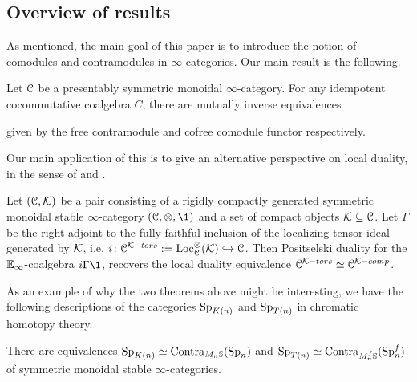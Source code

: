 \subsection*{Overview of results}

As mentioned, the main goal of this paper is to introduce the notion of comodules and contramodules in $\infty$-categories. Our main result is the following. 

\begin{introthm}
    \label{ch2:introthm:A}
    Let $\EuScript{C}$ be a presentably symmetric monoidal $\infty$-category. For any idempotent cocommutative coalgebra $C$, there are mutually inverse equivalences
    \begin{center}
    \end{center}
    given by the free contramodule and cofree comodule functor respectively. 
\end{introthm}

Our main application of this is to give an alternative perspective on local duality, in the sense of \cite{hovey-palmiery-strickland_97} and \cite{barthel-heard-valenzuela_2018}. 

\begin{introthm}
    \label{ch2:introthm:B}
    Let $(\EuScript{C}, \mathcal{K})$ be a pair consisting of a rigidly compactly generated symmetric monoidal stable $\infty$-category $(\C, \otimes, \1)$ and a set of compact objects $\mathcal{K}\subseteq \EuScript{C}$. Let $\Gamma$ be the right adjoint to the fully faithful inclusion of the localizing tensor ideal generated by $\mathcal{K}$, i.e. $i\colon\EuScript{C}^{\mathcal{K}-tors}:= \operatorname{Loc}_{\EuScript{C}}^\otimes (\mathcal{K})\hookrightarrow \EuScript{C}$. Then Positselski duality for the $\mathbb{E}_\infty$-coalgebra $i\Gamma \1$, recovers the local duality equivalence $\EuScript{C}^{\mathcal{K}-tors} \simeq \EuScript{C}^{\mathcal{K}-comp}$. 
\end{introthm}

As an example of why the two theorems above might be interesting, we have the following descriptions of the categories $\mathrm{Sp}_{K(n)}$ and $\mathrm{Sp}_{T(n)}$ in chromatic homotopy theory. 

\begin{introcor}
    There are equivalences $\mathrm{Sp}_{K(n)}\simeq \mathrm{Contra}_{M_n\mathbb{S}}(\mathrm{Sp}_n)$ and $\mathrm{Sp}_{T(n)}\simeq \mathrm{Contra}_{M_n^f \mathbb{S}}(\mathrm{Sp}_n^f)$ of symmetric monoidal stable $\infty$-categories. 
\end{introcor}



